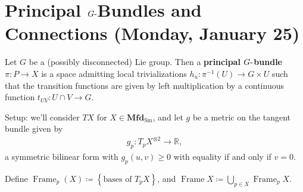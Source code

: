 \hypertarget{principal-ghbox-bundles-and-connections-monday-january-25}{%
\section{\texorpdfstring{Principal \(G{\hbox{-}}\)Bundles and
Connections (Monday, January
25)}{Principal G\{\textbackslash hbox\{-\}\}Bundles and Connections (Monday, January 25)}}\label{principal-ghbox-bundles-and-connections-monday-january-25}}

\begin{definition}

Let \(G\) be a (possibly disconnected) Lie group. Then a
\textbf{principal \(G{\hbox{-}}\)bundle} \(\pi:P\to X\) is a space
admitting local trivializations \(h_u: \pi ^{-1} (U) \to G \times U\)
such that the transition functions are given by left multiplication by a
continuous function \(t_{UV}: U \cap V \to G\).

\begin{figure}
\centering
{}
\end{figure}

\end{definition}

\begin{remark}

Setup: we'll consider \(TX\) for
\(X\in {\mathbf{Mfd}}_{\operatorname{Sm}}\), and let \(g\) be a metric
on the tangent bundle given by
\begin{align*}
g_p: T_pX^{\otimes 2} \to {\mathbb{R}}
,\end{align*}
a symmetric bilinear form with \(g_p(u, v) \geq 0\) with equality if and
only if \(v=0\).

\end{remark}

\begin{definition}

Define
\({\operatorname{Frame}}_p(X) \coloneqq\left\{{\text{bases of } T_p X}\right\}\),
and
\({\operatorname{Frame}}X \coloneqq\bigcup_{p\in X} {\operatorname{Frame}}_p X\).

\end{definition}

